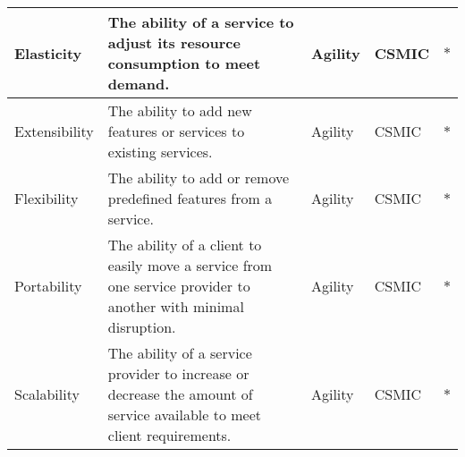 \begin{sidewaystable}[!ht]
\begin{center}
\begin{tabular}[c]{|p{2.5cm}|p{9cm}|p{1.5cm}|p{1.5cm}|p{1.5cm}|}
  Elasticity&The ability of a service to adjust its resource consumption to meet demand.&Agility&CSMIC&$\ast$ \\ \hline 
  Extensibility&The ability to add new features or services to existing services.&Agility&CSMIC&$\ast$ \\ \hline 
  Flexibility&The ability to add or remove predefined features from a service.&Agility&CSMIC&$\ast$ \\ \hline 
  Portability&The ability of a client to easily move a service from one service provider to another with minimal disruption.&Agility&CSMIC&$\ast$ \\ \hline 
  Scalability&The ability of a service provider to increase or decrease the amount of service available to meet client requirements.&Agility&CSMIC&$\ast$ \\ \hline 

\end{tabular}
\end{center}
\end{sidewaystable}
